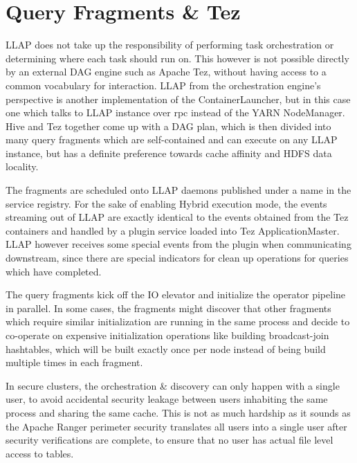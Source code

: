 \section{Query Fragments \& Tez}

LLAP does not take up the responsibility of performing task orchestration or determining where each task should run on. 
This however is not possible directly by an external DAG engine such as Apache Tez\cite{tez}, without having access to
a common vocabulary for interaction. LLAP from the orchestration engine's perspective is another implementation of the
ContainerLauncher, but in this case one which talks to LLAP instance over rpc instead of the YARN NodeManager. Hive and
Tez together come up with a DAG plan, which is then divided into many query fragments which are self-contained and can 
execute on any LLAP instance, but has a definite preference towards cache affinity and HDFS data locality.

The fragments are scheduled onto LLAP daemons published under a name in the service registry. For the sake of enabling 
Hybrid execution mode, the events streaming out of LLAP are exactly identical to the events obtained from the Tez containers
and handled by a plugin service loaded into Tez ApplicationMaster. LLAP however receives some special events from the
plugin when communicating downstream, since there are special indicators for clean up operations for queries which have
completed.

The query fragments kick off the IO elevator and initialize the operator pipeline in parallel. In some cases, the fragments
might discover that other fragments which require similar initialization are running in the same process and decide to 
co-operate on expensive initialization operations like building broadcast-join hashtables, which will be built exactly once
per node instead of being build multiple times in each fragment.


In secure clusters, the orchestration \& discovery can only happen with a single user, to avoid accidental security leakage
between users inhabiting the same process and sharing the same cache. This is not as much hardship as it sounds as the 
Apache Ranger\cite{ranger} perimeter security translates all users into a single user after security verifications are 
complete, to ensure that no user has actual file level access to tables.

